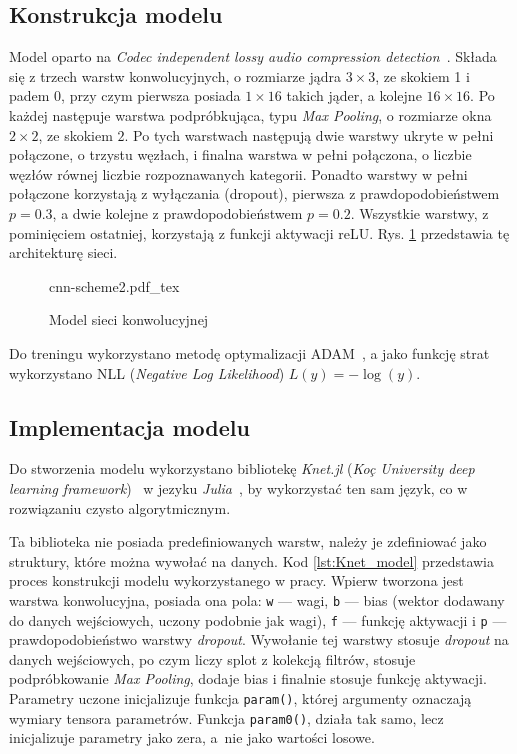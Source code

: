 \documentclass[pl,12pt]{aghdpl}
\let\Oldsubsection\subsection%
\renewcommand{\subsection}{\FloatBarrier\Oldsubsection}
\begin{document}
\subsection{Konstrukcja modelu}
Model oparto na \textit{Codec independent lossy audio compression
detection}~\cite{HennequinRoyoMoussalam2017}. Składa się z trzech warstw
konwolucyjnych, o rozmiarze jądra $3 \times 3$, ze skokiem 1 i padem 0, przy czym
pierwsza posiada $1 \times 16$ takich jąder, a kolejne $16\times 16$. Po każdej
następuje warstwa podpróbkująca, typu \textit{Max Pooling}, o rozmiarze okna $2
\times 2$, ze skokiem $2$. Po tych warstwach następują dwie warstwy ukryte w
pełni połączone, o trzystu węzłach, i finalna warstwa w pełni połączona, o liczbie
węzłów równej liczbie rozpoznawanych kategorii. Ponadto warstwy w pełni
połączone korzystają z wyłączania (dropout), pierwsza z prawdopodobieństwem $p
= 0.3$, a dwie kolejne z prawdopodobieństwem $p = 0.2$. Wszystkie warstwy, z
pominięciem ostatniej, korzystają z funkcji aktywacji reLU. Rys.
\ref{fig:cnn_scheme} przedstawia tę architekturę sieci.
\begin{figure}[!tbh]
  \centering
  \scriptsize{cnn-scheme2.pdf_tex}
  \caption{Model sieci konwolucyjnej}
  \label{fig:cnn_scheme}
\end{figure}

Do treningu wykorzystano metodę optymalizacji ADAM~\cite{KingmaBa2014}, a
jako funkcję strat wykorzystano NLL (\textit{Negative Log Likelihood}) $L(y) =
-\log(y)$.
\subsection{Implementacja modelu}
Do stworzenia modelu wykorzystano bibliotekę \textit{Knet.jl} (\textit{Koç
University deep learning framework})~\cite{Yuret2016} w jezyku
\textit{Julia}~\cite{BezansonEdelmanKarpinskiShah2017}, by wykorzystać ten sam
język, co w rozwiązaniu czysto algorytmicznym.

Ta biblioteka nie posiada predefiniowanych warstw, należy je zdefiniować
jako struktury, które można wywołać na danych. Kod \ref{lst:Knet_model}
przedstawia proces konstrukcji modelu wykorzystanego w pracy. Wpierw tworzona
jest warstwa konwolucyjna, posiada ona pola: \lstinline|w| --- wagi,
\lstinline|b| --- bias (wektor dodawany do danych wejściowych, uczony podobnie
jak wagi), \lstinline|f| --- funkcję aktywacji i \lstinline|p| ---
prawdopodobieństwo warstwy \textit{dropout}. Wywołanie tej warstwy stosuje
\textit{dropout} na danych wejściowych, po czym liczy splot z kolekcją filtrów,
stosuje podpróbkowanie \textit{Max Pooling}, dodaje bias i finalnie stosuje
funkcję aktywacji. Parametry uczone inicjalizuje funkcja \lstinline|param()|,
której argumenty oznaczają wymiary tensora parametrów. Funkcja
\lstinline|param0()|, działa tak samo, lecz inicjalizuje parametry jako zera,
a~nie jako wartości losowe.
\end{document}
